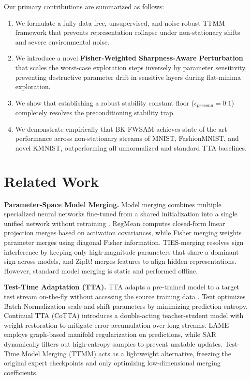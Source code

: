 \documentclass{article}
\theoremstyle{plain}
\theoremstyle{definition}
\theoremstyle{remark}
\begin{document}
Our primary contributions are summarized as follows:
\begin{enumerate}
  \item We formulate a fully data-free, unsupervised, and noise-robust TTMM framework that prevents representation collapse under non-stationary shifts and severe environmental noise.
  \item We introduce a novel \textbf{Fisher-Weighted Sharpness-Aware Perturbation} that scales the worst-case exploration steps inversely by parameter sensitivity, preventing destructive parameter drift in sensitive layers during flat-minima exploration.
  \item We show that establishing a robust stability constant floor ($\epsilon_{precond} = 0.1$) completely resolves the preconditioning stability trap.
  \item We demonstrate empirically that BK-FWSAM achieves state-of-the-art performance across non-stationary streams of MNIST, FashionMNIST, and novel KMNIST, outperforming all unnormalized and standard TTA baselines.
\end{enumerate}

\section{Related Work}
\label{sec:related}

\textbf{Parameter-Space Model Merging.} Model merging combines multiple specialized neural networks fine-tuned from a shared initialization into a single unified network without retraining \cite{wortsman2022robust, yadav2023ties, ainsworth2023git, yang2023regmean, matena2022merging, stoica2023zipit}. RegMean \cite{yang2023regmean} computes closed-form linear projection merges based on activation covariances, while Fisher merging \cite{matena2022merging} weights parameter merges using diagonal Fisher information. TIES-merging \cite{yadav2023ties} resolves sign interference by keeping only high-magnitude parameters that share a dominant sign across models, and ZipIt! \cite{stoica2023zipit} merges features to align hidden representations. However, standard model merging is static and performed offline.

\textbf{Test-Time Adaptation (TTA).} TTA adapts a pre-trained model to a target test stream on-the-fly without accessing the source training data \cite{wang2021tent, wang2022continual, niu2022sar}. Tent \cite{wang2021tent} optimizes Batch Normalization scale and shift parameters by minimizing prediction entropy. Continual TTA (CoTTA) \cite{wang2022continual} introduces a double-acting teacher-student model with weight restoration to mitigate error accumulation over long streams. LAME \cite{boudiaf2022lame} employs graph-based manifold regularization on predictions, while SAR \cite{niu2022sar} dynamically filters out high-entropy samples to prevent unstable updates. Test-Time Model Merging (TTMM) \cite{yang2024test} acts as a lightweight alternative, freezing the original expert checkpoints and only optimizing low-dimensional merging coefficients.
\end{document}
